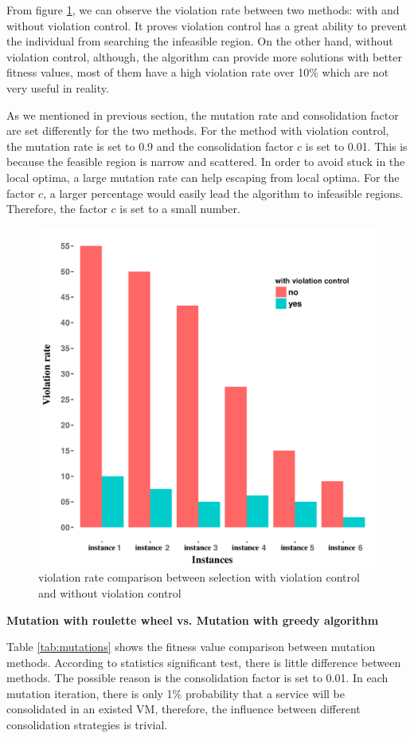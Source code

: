 From figure \ref{fig:violations}, we can observe the violation rate between two methods: with and without violation control.
It proves violation control has a great ability to prevent the individual from searching the infeasible region. On the other hand, without violation control, although, the algorithm can provide more solutions with better fitness values, most of them have a high violation rate over 10\% which are not very useful in reality.

As we mentioned in previous section, the mutation rate and consolidation factor are set differently for the two methods. For the method with violation control, the mutation rate is set to 0.9 and the consolidation factor $c$ is set to 0.01. This is because the feasible region is narrow and scattered. In order to avoid stuck in the local optima, a large mutation rate can help escaping from local optima. For the factor $c$, a larger percentage would easily lead the algorithm to infeasible regions. Therefore, the factor $c$ is set to a small number.





\begin{figure}
\centering
  \includegraphics[width=.7\textwidth]{pics/preliminary/violations.png}
  \caption{violation rate comparison between selection with violation control and without violation control}
  \label{fig:violations}
\end{figure}



\begin{flushleft}\textbf{Mutation with roulette wheel vs. Mutation with greedy algorithm}\end{flushleft}
Table \ref{tab:mutations} shows the fitness value comparison between mutation methods. According
to statistics significant test, there is little difference between methods. The possible reason
is the consolidation factor is set to 0.01. In each mutation iteration, there is only 1\% probability
that a service will be consolidated in an existed VM, therefore, the influence between
different consolidation strategies is trivial.





